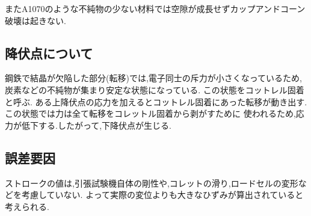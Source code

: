 またA1070のような不純物の少ない材料では空隙が成長せずカップアンドコーン破壊は起きない.
\subsection{降伏点について\cite{kouhuku}}
鋼鉄で結晶が欠陥した部分(転移)では,電子同士の斥力が小さくなっているため,炭素などの不純物が集まり安定な状態になっている.
この状態をコットレル固着と呼ぶ.
ある上降伏点の応力を加えるとコットレル固着にあった転移が動き出す.この状態では力は全て転移をコレットル固着から剥がすために
使われるため,応力が低下する.したがって,下降伏点が生じる.
\subsection{誤差要因}
ストロークの値は,引張試験機自体の剛性や,コレットの滑り,ロードセルの変形などを考慮していない.
よって実際の変位よりも大きなひずみが算出されていると考えられる.